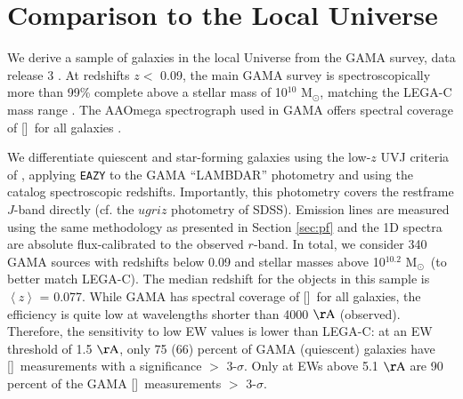 \documentclass[twocolumn,natbib,iop,hyperref]{aastex62}
\newcommand{\msol}{M$_{\odot}$}
\newcommand{\oii}{[\ion{O}{2}]}
\begin{document}
\section{Comparison to the Local Universe}
\label{sec:gama}

We derive a sample of galaxies in the local Universe from the GAMA survey, data release 3 \citep{2011MNRAS.413..971D,2015MNRAS.452.2087L,2018MNRAS.474.3875B}.  At redshifts $z <$ 0.09, the main GAMA survey is spectroscopically more than 99\% complete above a stellar mass of 10$^{10}$ \msol, matching the LEGA-C mass range \citep{2011MNRAS.418.1587T}.  The AAOmega spectrograph used in GAMA offers spectral coverage of \oii\ for all galaxies \citep{2006SPIE.6269E..0GS}.

We differentiate quiescent and star-forming galaxies using the low-$z$ UVJ criteria of \citet{2011ApJ...735...86W}, applying \texttt{EAZY} to the GAMA ``LAMBDAR'' photometry \citep{2016MNRAS.460..765W} and using the catalog spectroscopic redshifts.  Importantly, this photometry covers the restframe $J$-band directly (cf. the $ugriz$ photometry of SDSS).  Emission lines are measured using the same methodology as presented in Section \ref{sec:pf} and the 1D spectra are absolute flux-calibrated to the observed $r$-band.  
In total, we consider 340 GAMA sources with redshifts below 0.09 and stellar masses above 10$^{10.2}$ \msol\ (to better match LEGA-C).  The median redshift for the objects in this sample is $\left<z\right>$ = 0.077.  While GAMA has spectral coverage of \oii\ for all galaxies, the efficiency is quite low at wavelengths shorter than 4000 $\mathrm{\AA}$ (observed).  Therefore, the sensitivity to low EW values is lower than LEGA-C: at an EW threshold of 1.5 $\mathrm{\AA}$, only 75 (66) percent of GAMA (quiescent) galaxies have \oii\ measurements with a significance $>$ 3-$\sigma$.  Only at EWs above 5.1 $\mathrm{\AA}$ are 90 percent of the GAMA  \oii\ measurements $>$ 3-$\sigma$.
\end{document}
